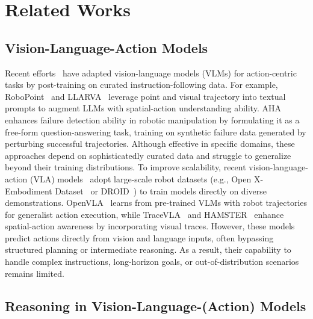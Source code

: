\section{Related Works}
\label{sec:related_works}

\subsection{Vision-Language-Action Models}

Recent efforts~\cite{li2024llara,yuan2024robopoint,duan2024aha,niu2024llarva} have adapted vision-language models (VLMs) for action-centric tasks by post-training on curated instruction-following data. For example, RoboPoint~\cite{yuan2024robopoint} and LLARVA~\cite{niu2024llarva} leverage point and visual trajectory into textual prompts to augment LLMs with spatial-action understanding ability. AHA~\cite{duan2024aha} enhances failure detection ability in robotic manipulation by formulating it as a free-form question-answering task, training on synthetic failure data generated by perturbing successful trajectories. Although effective in specific domains, these approaches depend on sophisticatedly curated data and struggle to generalize beyond their training distributions. To improve scalability, recent vision-language-action (VLA) models~\cite{kim24openvla,zheng2024tracevla,szot2024multimodal,bjorck2025gr00t,li2025hamster,yang2025magma,brohan2022rt} adopt large-scale robot datasets (e.g., Open X-Embodiment Dataset~\cite{o2024open} or DROID~\cite{khazatsky2024droid}) to train models directly on diverse demonstrations. OpenVLA~\cite{kim24openvla} learns from pre-trained VLMs with robot trajectories for generalist action execution, while TraceVLA~\cite{zheng2024tracevla} and HAMSTER~\cite{li2025hamster} enhance spatial-action awareness by incorporating visual traces. However, these models predict actions directly from vision and language inputs, often bypassing structured planning or intermediate reasoning. As a result, their capability to handle complex instructions, long-horizon goals, or out-of-distribution scenarios remains limited.


\subsection{Reasoning in Vision-Language-(Action) Models}

